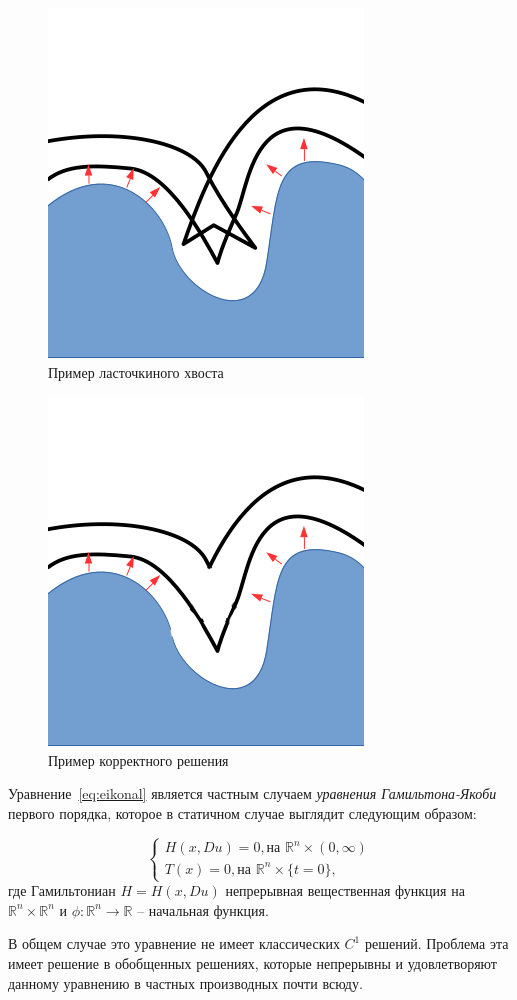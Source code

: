 \begin{figure}[h]
  \centering
  \includegraphics[width=0.3\linewidth]{img/swallow-tail-example.png}
  \hfil \caption{Пример ласточкиного хвоста}
  \label{fig:swallow-ex}

\end{figure}

\begin{figure}[h]
  \centering
  \includegraphics[width=0.3\linewidth]{img/corrct-example.png}
  \hfil \caption{Пример корректного решения}
  \label{fig:correct-exmp}

\end{figure}

Уравнение~\eqref{eq:eikonal} является частным случаем \textit{уравнения
Гамильтона-Якоби} первого порядка, которое в статичном случае выглядит
следующим образом:

\begin{equation}
  \label{eq:hje}
  \left\{ \begin{matrix}
      H(x, Du) = 0,\text{на } \mathbb{R}^n \times (0,\infty) \\
      T(x) = 0,  \text{на } \mathbb{R}^n \times \{t = 0\},
    \end{matrix}\right.
\end{equation}
где Гамильтониан $H = H(x,Du)$ непрерывная вещественная функция на
$\mathbb{R}^n \times \mathbb{R}^n$ и $\phi : \mathbb{R}^n \rightarrow
\mathbb{R}$ -- начальная функция.

В общем случае это уравнение не имеет классических $C^1$
решений. Проблема эта имеет решение в обобщенных решениях, которые
непрерывны и удовлетворяют данному уравнению в частных производных
почти всюду.

